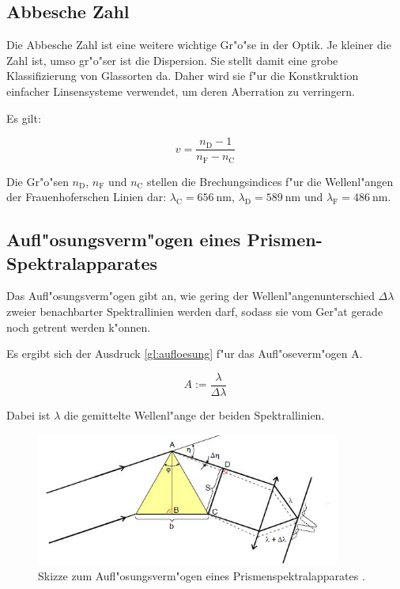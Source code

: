 	\subsection{Abbesche Zahl} %
	\label{sub:abbesche_zahl}

	Die Abbesche Zahl ist eine weitere wichtige Gr"o"se in der Optik. Je kleiner die Zahl ist, umso gr"o"ser ist die Dispersion. Sie stellt damit eine grobe Klassifizierung von Glassorten da. Daher wird sie f"ur die Konstkruktion einfacher Linsensysteme verwendet, um deren Aberration zu verringern. 

	Es gilt:

	\begin{equation}
		v = \frac{n_\mathrm{D} - 1}{n_\mathrm{F} - n_\mathrm{C}} \label{eqn:abbe}
	\end{equation}

	Die Gr"o"sen $n_\mathrm{D}$, $n_\mathrm{F}$ und $n_\mathrm{C}$ stellen die Brechungsindices f"ur die Wellenl"angen der Frauenhoferschen Linien dar: $\lambda_\mathrm{C} = \SI{656}{\nano\meter}$, $\lambda_\mathrm{D} = \SI{589}{\nano\meter}$ und $\lambda_\mathrm{F} = \SI{486}{\nano\meter}$.

	\subsection{Aufl"osungsverm"ogen eines Prismen-Spektralapparates} %
	\label{sub:aufl_osungsverm_ogen_eines_prismen_spektralapparates}
	
	Das Aufl"osungsverm"ogen gibt an, wie gering der Wellenl"angenunterschied $\Delta\lambda$ zweier benachbarter Spektrallinien werden darf, sodass sie vom Ger"at gerade noch getrent werden k"onnen.

	Es ergibt sich der Ausdruck \eqref{gl:aufloesung} f"ur das Aufl"oseverm"ogen A.

	\begin{equation}
		A := \frac{\lambda}{\Delta\lambda} \label{gl:aufloesung}
	\end{equation}

	Dabei ist $\lambda$ die gemittelte Wellenl"ange der beiden Spektrallinien.

	\begin{figure}[!h]
		\centering
		\includegraphics[width = 10cm]{img/aufloesung.JPG}
		\caption{Skizze zum Aufl"osungsverm"ogen eines Prismenspektralapparates \cite{anleitung}.}
		\label{fg:aufloesung}
	\end{figure}

